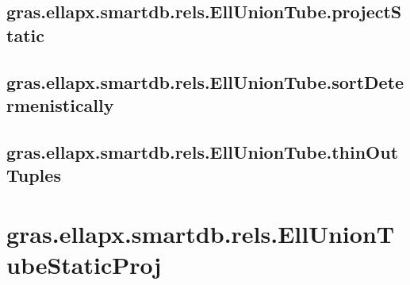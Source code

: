 \documentclass[letterpaper,10pt,english]{sphinxmanual}
\begin{document}
\subsection{gras.ellapx.smartdb.rels.EllUnionTube.projectStatic}
\label{chap_functions:gras-ellapx-smartdb-rels-elluniontube-projectstatic}

\subsection{gras.ellapx.smartdb.rels.EllUnionTube.sortDetermenistically}
\label{chap_functions:gras-ellapx-smartdb-rels-elluniontube-sortdetermenistically}

\subsection{gras.ellapx.smartdb.rels.EllUnionTube.thinOutTuples}
\label{chap_functions:gras-ellapx-smartdb-rels-elluniontube-thinouttuples}

\section{gras.ellapx.smartdb.rels.EllUnionTubeStaticProj}
\label{chap_functions:gras-ellapx-smartdb-rels-elluniontubestaticproj}
\end{document}
